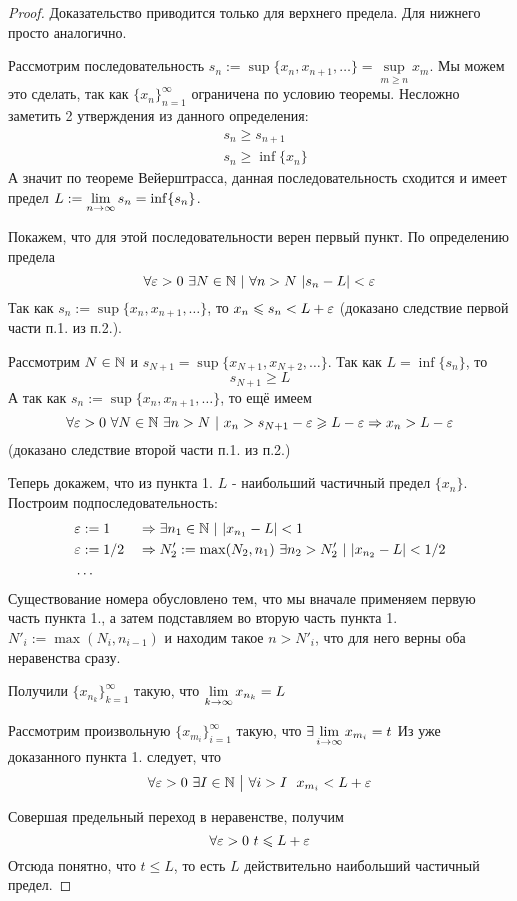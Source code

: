 \begin{proof}
	Доказательство приводится только для верхнего предела. Для нижнего просто аналогично.
	
	Рассмотрим последовательность $s_n := \sup \{x_n, x_{n + 1}, \dots\} = \sup\limits_{m \ge n} x_m$. Мы можем это сделать, так как $\{x_n\}_{n = 1}^\infty$ ограничена по условию теоремы. Несложно заметить 2 утверждения из данного определения:
	\begin{align*}
		&s_n \ge s_{n + 1}
		\\
		&s_n \ge \inf \{x_n\}
	\end{align*}
	А значит по теореме Вейерштрасса, данная последовательность сходится и имеет предел $L := \lim\limits_{n \to \infty} s_n = \inf \{s_n\}$. 
	
	Покажем, что для этой последовательности верен первый пункт. По определению предела 
	$$
		\forall \eps > 0\ \exists N \in \N\ |\ \forall n > N\ |s_n - L| < \eps
	$$
	Так как $s_n := \sup \{x_n, x_{n + 1}, \dots\}$, то $x_n \leqslant s_n < L + \varepsilon$ (доказано следствие первой части п.1. из п.2.).
	
	Рассмотрим $N \in \mathbb{N}$ и $s_{N + 1} = \sup \{x_{N + 1}, x_{N + 2}, \dots\}$. Так как $L = \inf \{s_n\}$, то 
	$$
		s_{N + 1} \ge L
	$$
	А так как $s_n := \sup \{x_n, x_{n + 1}, \dots\}$, то ещё имеем
	$$
		\forall \varepsilon > 0\ \forall N \in \mathbb{N}\ \exists n > N\ |\ x_n > s_{N + 1} - \varepsilon \geqslant L - \varepsilon \Rightarrow x_n > L - \varepsilon
	$$
	(доказано следствие второй части п.1. из п.2.)
	
	Теперь докажем, что из пункта 1. $L$ - наибольший частичный предел $\{x_n\}$. Построим подпоследовательность:
	\begin{align*}
		&\varepsilon := 1 & &\Rightarrow \exists n_1 \in \mathbb{N}\ |\ |x_{n_1} - L| < 1
		\\
		&\varepsilon := 1/2 & &\Rightarrow N'_2 := \max(N_2, n_1)\ \exists n_2 > N'_2\ |\ |x_{n_2} - L| < 1/2
		\\
		&\dots		
	\end{align*}
	Существование номера обусловлено тем, что мы вначале применяем первую часть пункта 1., а затем подставляем во вторую часть пункта 1. $N'_i := \max(N_i, n_{i - 1})$ и находим такое $n > N'_i$, что для него верны оба неравенства сразу.
	
	Получили $\{x_{n_k}\}_{k = 1}^\infty$ такую, что $\lim\limits_{k \to \infty} x_{n_k} = L$
	
	Рассмотрим произвольную $\{x_{m_i}\}_{i = 1}^\infty$ такую, что $\exists \lim\limits_{i \to \infty} x_{m_i} = t$ Из уже доказанного пункта 1. следует, что
	$$
		\forall \varepsilon > 0\ \exists I \in \mathbb{N} \ \big|\  \forall i > I\ \ x_{m_i} < L + \varepsilon
	$$
	
	Совершая предельный переход в неравенстве, получим
	$$
		\forall \varepsilon > 0\ t \leqslant L + \varepsilon
	$$
	Отсюда понятно, что $t \le L$, то есть $L$ действительно наибольший частичный предел.
\end{proof}


